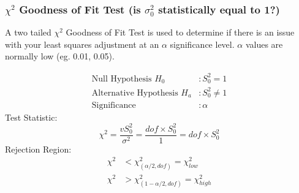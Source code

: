 \documentclass{article}
\begin{document}
	\subsubsection*{$\chi^2$ Goodness of Fit Test (is $\sigma_0^2$ statistically equal to 1?)}
	A two tailed $\chi^2$ Goodness of Fit Test is used to determine if there is an issue with your least squares adjustment at an $\alpha$ significance level.  $\alpha$ values are normally low (eg. 0.01, 0.05).
	
	\begin{align*}
	\text{Null Hypothesis } H_0 &: S_0^2 = 1 \\
	\text{Alternative Hypothesis } H_a &: S_0^2 \neq 1 \\
	\text{Significance } &: \alpha
	\end{align*}
	Test Statistic:
	\[
	\chi^2 = \dfrac{vS_0^2}{\sigma^2} = \dfrac{dof\times S_0^2}{1} = dof\times S_0^2
	\]
	Rejection Region:
	\begin{align*}
	\chi^2 &< \chi_{(\alpha/2,dof)}^2 = \chi^2_{low} \\
	\chi^2 &> \chi_{(1-\alpha/2,dof)}^2 = \chi^2_{high} \\
	\end{align*}
	
	\clearpage
\end{document}
